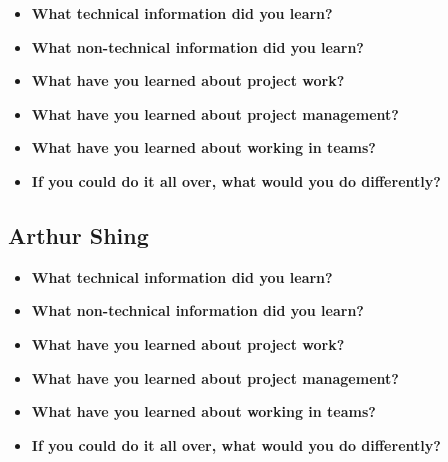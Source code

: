 \documentclass[onecolumn, draftclsnofoot,10pt, compsoc]{IEEEtran}
\begin{document}
\begin{itemize}
\item{\textbf{What technical information did you learn?}}

\item{\textbf{What non-technical information did you learn?}}

\item{\textbf{What have you learned about project work?}}

\item{\textbf{What have you learned about project management?}}


\item{\textbf{What have you learned about working in teams?}}


\item{\textbf{If you could do it all over, what would you do differently?}}
\end{itemize}

\subsection{Arthur Shing}
\begin{itemize}
\item{\textbf{What technical information did you learn?}}

\item{\textbf{What non-technical information did you learn?}}

\item{\textbf{What have you learned about project work?}}

\item{\textbf{What have you learned about project management?}}


\item{\textbf{What have you learned about working in teams?}}


\item{\textbf{If you could do it all over, what would you do differently?}}
\end{itemize}

	



\pagebreak
\clearpage
\end{document}
